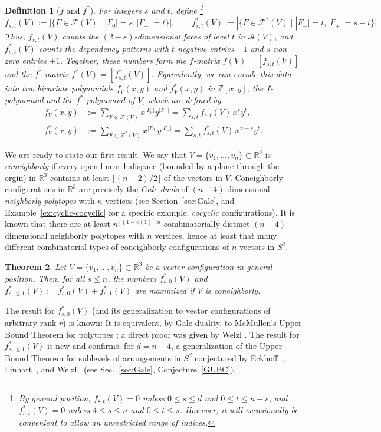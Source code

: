 \documentclass[11pt]{article}
\newtheorem{theorem}{Theorem}
\newtheorem{definition}[theorem]{Definition}
\newcommand{\arr}{\mathcal{A}}
\renewcommand{\leq}{\leqslant}
\newcommand{\R}{\mathbb{R}}
\newcommand{\Z}{\mathbb{Z}}
\begin{document}
\begin{definition}[$f$ and $f^*$]
\label{def:f-poly}
For integers $s$ and $t$, define%
\footnote{By general position, $f_{s,t}(V)=0$ unless $0\leq s\leq d$ and $0\leq t\leq n-s$, and 
$f^*_{s,t}(V)=0$ unless $4\leq s \leq n$ and $0\leq t\leq s$. However, it will occasionally be convenient to allow an unrestricted range of indices.}
$$
f_{s,t}(V):=|\{F\in \mathcal{F}(V)\mid |F_0|=s,|F_-|=t\}|, \qquad f^*_{s,t}(V):=|\{F\in \mathcal{F}^*(V)\mid |F_-|=t, |F_+|=s-t\}|
$$
Thus, $f_{s,t}(V)$ counts the $(2-s)$-dimensional faces of level $t$ in $\arr(V)$, and $f^*_{s,t}(V)$ counts the dependency patterns with $t$ negative entries $-1$ and $s$ non-zero entries $\pm 1$.
%
Together, these numbers form the \emph{$f$-matrix} $f(V)=[f_{s,t}(V)]$ and the \emph{$f^*$-matrix} $f^*(V)=[f^*_{s,t}(V)]$. Equivalently, we can encode this data into two bivariate polynomials
$f_V(x,y)$ and $f^*_V(x,y)$ in $\Z[x,y]$, the \emph{$f$-polynomial} and the \emph{$f^*$-polynomial} of $V$, which are defined by 
\begin{align*} 
f_{V}(x,y) & :=  \sum_{F\in \mathcal{F}(V)} x^{|F_0|} y^{|F_-|} = \sum_{s,t} f_{s,t}(V)\, x^s y^t,\\
f^*_{V}(x,y) &:= \sum_{F\in \mathcal{F}^*(V)} x^{|F_0|} y^{|F_-|} = \sum_{s,t} f^*_{s,t}(V)\, x^{n-s} y^t.
\end{align*}
\end{definition}
We are ready to state our first result. We say that $V = \{ v_1, \ldots, v_n \} \subset \R^3$ is \emph{coneighborly} if every open linear halfspace (bounded by a plane through the orgin) in $\R^3$ contains at least $\lfloor (n-2)/2 \rfloor$ of the vectors in $V$. Coneighborly configurations in $\R^3$ are precisely the \emph{Gale duals} of $(n-4)$-dimensional \emph{neighborly polytopes} with $n$ vertices (see Section~\ref{sec:Gale}, and Example~\ref{ex:cyclic-cocyclic} for a specific example, \emph{cocyclic} configurations). It is known \cite{Padrol:2013aa} that there are at least $n^{\frac{3}{2}(1-o(1))n}$ combinatorially distinct $(n-4)$-dimensional neighborly polytopes with $n$ vertices, hence at least that many different combinatorial types of 
coneighborly configurations of $n$ vectors in $S^2$. 
\begin{theorem} 
\label{thm:GUBT-fstar}
Let $V = \{ v_1, \ldots, v_n \} \subset \R^3$ be a vector configuration in general position. Then, for all $s\leq n$, the numbers $f^*_{s,0}(V)$ and $f^*_{s,\leq 1}(V):=f^*_{s,0}(V)+f^*_{s,1}(V)$ are maximized if $V$ is coneighborly.
\end{theorem}
The result for $f^*_{s,0}(V)$ (and its generalization to vector configurations of arbitrary rank $r$) is known: It is equivalent, by Gale duality, to McMullen's Upper Bound Theorem for polytopes \cite{McMullen:1970aa}; a direct proof was given by Welzl \cite{Welzl:2001aa}. The result for $f^*_{s,\leq 1}(V)$ is new and confirms, for $d=n-4$, a generalization of the Upper Bound Theorem for sublevels of arrangements in $S^d$ conjectured by Eckhoff~\cite{Eckhoff:1993aa}, Linhart~\cite{Linhart:1994aa}, and Welzl~\cite{Welzl:2001aa} (see Sec.~\ref{sec:Gale}, Conjecture~\ref{GUBC}). 
%
\end{document}
